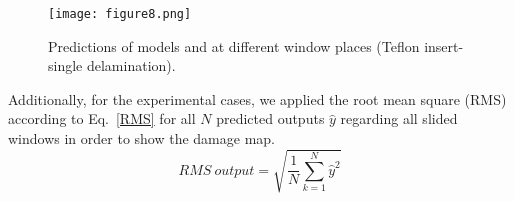 \begin{figure}[!h]
	\centering
	\texttt{[image: figure8.png]}
	\caption{Predictions of models  and  at different window places (Teflon insert-single delamination).}
	\label{fig:CFRP_Teflon_3o_predictions}
\end{figure}

Additionally, for the experimental cases, we applied the root mean square (RMS) according to Eq.~\ref{RMS} for all \(N\) predicted outputs \(\hat{y}\) regarding all slided windows in order to show the damage map.
\begin{equation}
	RMS\ output = \sqrt{\frac{1}{N}\sum_{k=1}^{N}\hat{y}^2}	
	\label{RMS}
\end{equation}

